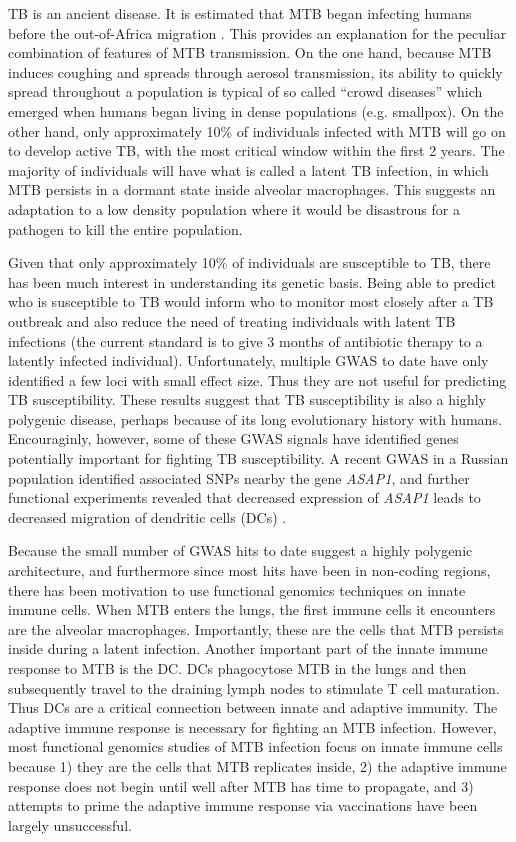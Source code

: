 TB is an ancient disease. It is estimated that MTB began infecting
humans before the out-of-Africa migration \cite{Comas2013}. This
provides an explanation for the peculiar combination of features of
MTB transmission. On the one hand, because MTB induces coughing and
spreads through aerosol transmission, its ability to quickly spread
throughout a population is typical of so called “crowd diseases” which
emerged when humans began living in dense populations
(e.g. smallpox). On the other hand, only approximately 10\% of
individuals infected with MTB will go on to develop active TB, with
the most critical window within the first 2 years. The majority of
individuals will have what is called a latent TB infection, in which
MTB persists in a dormant state inside alveolar macrophages. This
suggests an adaptation to a low density population where it would be
disastrous for a pathogen to kill the entire population.

Given that only approximately 10\% of individuals are susceptible to
TB, there has been much interest in understanding its genetic
basis. Being able to predict who is susceptible to TB would inform who
to monitor most closely after a TB outbreak and also reduce the need
of treating individuals with latent TB infections (the current
standard is to give 3 months of antibiotic therapy to a latently
infected individual). Unfortunately, multiple GWAS to date have only
identified a few loci with small effect size. Thus they are not useful
for predicting TB susceptibility. These results suggest that TB
susceptibility is also a highly polygenic disease, perhaps because of
its long evolutionary history with humans. Encouraginly, however, some
of these GWAS signals have identified genes potentially important for
fighting TB susceptibility. A recent GWAS in a Russian population
identified associated SNPs nearby the gene \emph{ASAP1}, and further
functional experiments revealed that decreased expression of
\emph{ASAP1} leads to decreased migration of dendritic cells (DCs)
\citep{Curtis2015}.

Because the small number of GWAS hits to date suggest a highly
polygenic architecture, and furthermore since most hits have been in
non-coding regions, there has been motivation to use functional
genomics techniques on innate immune cells. When MTB enters the lungs,
the first immune cells it encounters are the alveolar
macrophages. Importantly, these are the cells that MTB persists inside
during a latent infection. Another important part of the innate immune
response to MTB is the DC. DCs phagocytose MTB in the lungs and then
subsequently travel to the draining lymph nodes to stimulate T cell
maturation. Thus DCs are a critical connection between innate and
adaptive immunity. The adaptive immune response is necessary for
fighting an MTB infection. However, most functional genomics studies
of MTB infection focus on innate immune cells because 1) they are the
cells that MTB replicates inside, 2) the adaptive immune response does
not begin until well after MTB has time to propagate, and 3) attempts
to prime the adaptive immune response via vaccinations have been
largely unsuccessful.

